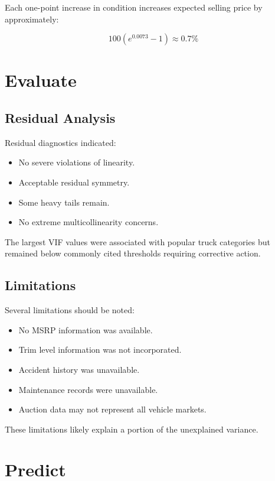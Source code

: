 \documentclass[
  12pt]{article}
\providecommand{\tightlist}{%
  \setlength{\itemsep}{0pt}\setlength{\parskip}{0pt}}
\begin{document}
Each one-point increase in condition increases expected selling price by
approximately:

\[
100(e^{0.0073}-1) \approx 0.7\%
\]

\section{Evaluate}\label{sec-evaluate}

\subsection{Residual Analysis}\label{residual-analysis}

Residual diagnostics indicated:

\begin{itemize}
\tightlist
\item
  No severe violations of linearity.
\item
  Acceptable residual symmetry.
\item
  Some heavy tails remain.
\item
  No extreme multicollinearity concerns.
\end{itemize}

The largest VIF values were associated with popular truck categories but
remained below commonly cited thresholds requiring corrective action.

\subsection{Limitations}\label{limitations}

Several limitations should be noted:

\begin{itemize}
\tightlist
\item
  No MSRP information was available.
\item
  Trim level information was not incorporated.
\item
  Accident history was unavailable.
\item
  Maintenance records were unavailable.
\item
  Auction data may not represent all vehicle markets.
\end{itemize}

These limitations likely explain a portion of the unexplained variance.

\section{Predict}\label{sec-predict}
\end{document}
